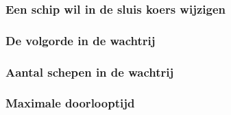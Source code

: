 \subsubsection{Een schip wil in de sluis koers wijzigen}

\subsubsection{De volgorde in  de wachtrij}


\subsubsection{Aantal schepen in de wachtrij}	

\subsubsection{Maximale doorlooptijd }


